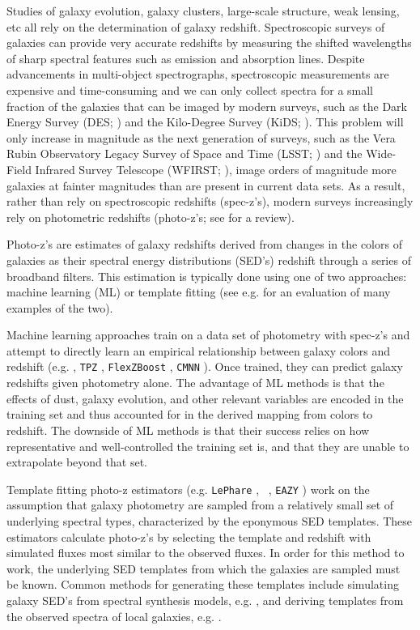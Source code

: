
Studies of galaxy evolution, galaxy clusters, large-scale structure, weak lensing, etc all rely on the determination of galaxy redshift.
Spectroscopic surveys of galaxies can provide very accurate redshifts by measuring the shifted wavelengths of sharp spectral features such as emission and absorption lines.
Despite advancements in multi-object spectrographs, spectroscopic measurements are expensive and time-consuming and we can only collect spectra for a small fraction of the galaxies that can be imaged by  modern surveys, such as the Dark Energy Survey (DES; \citealt{TheDarkEnergySurveyCollaboration2005}) and the Kilo-Degree Survey (KiDS; \citealt{DeJong2013a}).
This problem will only increase in magnitude as the next generation of surveys, such as the Vera Rubin Observatory Legacy Survey of Space and Time (LSST; \citealt{LSSTScienceCollaboration2009}) and the Wide-Field Infrared Survey Telescope (WFIRST; \citealt{Green2012}), image orders of magnitude more galaxies at fainter magnitudes than are present in current data sets.
As a result, rather than rely on spectroscopic redshifts (spec-z's), modern surveys increasingly rely on photometric redshifts (photo-z's; see \citealt{Salvato2019} for a review).

Photo-z's are estimates of galaxy redshifts derived from changes in the colors of galaxies as their spectral energy distributions (SED's) redshift through a series of broadband filters.
This estimation is typically done using one of two approaches: machine learning (ML) or template fitting (see e.g. \citealt{Schmidt2020} for an evaluation of many examples of the two).

Machine learning approaches train on a data set of photometry with spec-z's and attempt to directly learn an empirical relationship between galaxy colors and redshift (e.g. \citealt{Connolly95}, \texttt{TPZ} \citealt{Kind2013}, \texttt{FlexZBoost} \citealt{Izbicki2017}, \texttt{CMNN} \citealt{Graham2018a}).
Once trained, they can predict galaxy redshifts given photometry alone.
The advantage of ML methods is that the effects of dust, galaxy evolution, and other relevant variables are encoded in the training set and thus accounted for in the derived mapping from colors to redshift.
The downside of ML methods is that their success relies on how representative and well-controlled the training set is, and that they are unable to extrapolate beyond that set.

Template fitting photo-z estimators (e.g. \texttt{LePhare} \citealt{Arnouts1999}, \bpz\ \citealt{Benitez2000a}, \texttt{EAZY} \citealt{Brammer2008}) work on the assumption that galaxy photometry are sampled from a relatively small set of underlying spectral types, characterized by the eponymous SED templates. 
These estimators calculate photo-z's by selecting the template and redshift with simulated fluxes most similar to the observed fluxes. 
In order for this method to work, the underlying SED templates from which the galaxies are sampled must be known. 
Common methods for generating these templates include simulating galaxy SED's from spectral synthesis models, e.g. \citet{BruzualA.1993a}, and deriving templates from the observed spectra of local galaxies, e.g. \citet{Benitez2004a}. 


